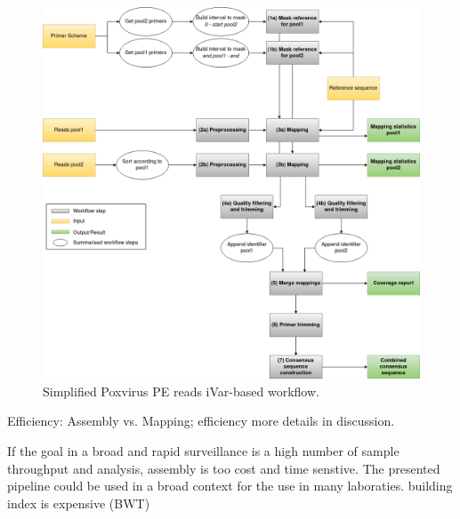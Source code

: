\begin{figure}[H]
	\includegraphics[width=1\textwidth]{media/pox.png}
	\caption{Simplified Poxvirus PE reads iVar-based workflow.}
	\label{fig:3-pox-wf}
\end{figure}


Efficiency: Assembly vs. Mapping; efficiency more details in discussion.

If the goal in a broad and rapid surveillance is a high number of sample throughput and analysis, assembly is too cost and time senstive. The presented pipeline could be used in a broad context for the use in many laboraties.
building index is expensive (BWT)


